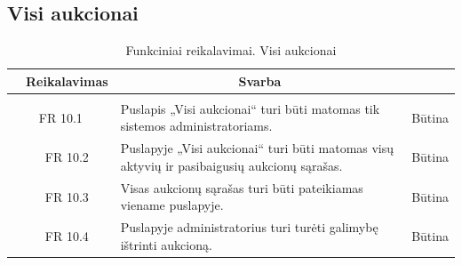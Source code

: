 \documentclass{VUMIFPSkursinis}
\begin{document}
	\subsection{Visi aukcionai}
	\begin{table}[H]
		\caption{Funkciniai reikalavimai. Visi aukcionai}
		\begin{tabular}{|p{1cm}|p{1cm}|p{}|p{}|}
			\hline 
			\rowcolor{gray!50}
			\multicolumn{2}{|c|}{{\bfseries Kodas}}&
			\multicolumn{1}{c|}{{\bfseries Reikalavimas}}&
			\multicolumn{1}{c|}{{\bfseries Svarba}}\\
			\hline
			\rowcolor{lightgray}
			\multicolumn{4}{|c|}{Visi aukcionai}\\				
			\hline
			\multicolumn{2}{|c|}{FR 10.1}&
			{Puslapis „Visi aukcionai“ turi būti matomas tik sistemos administratoriams.
			}&		
			\multicolumn{1}{c|}{Būtina}\\
			\hline
			\multicolumn{1}{|c}{}&
			\multicolumn{1}{c|}{FR 10.2}&
			{Puslapyje „Visi aukcionai“ turi būti matomas visų aktyvių ir pasibaigusių aukcionų sąrašas.
			}&		
			\multicolumn{1}{c|}{Būtina}\\
			\hline	
			\multicolumn{1}{|c}{}&
			\multicolumn{1}{c|}{FR 10.3}&
			{Visas aukcionų sąrašas turi būti pateikiamas viename puslapyje.
			}&
			\multicolumn{1}{c|}{Būtina}\\									
			\hline
			\multicolumn{1}{|c}{}&
			\multicolumn{1}{c|}{FR 10.4}&
			{Puslapyje administratorius turi turėti galimybę ištrinti aukcioną.
			}&
			\multicolumn{1}{c|}{Būtina}\\									
			\hline
		\end{tabular}		
	\end{table}
	
\end{document}
